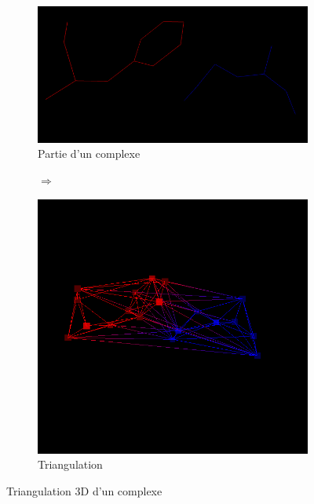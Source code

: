 \begin{figure}[ht]
\centering
\begin{subfigure}{0.45\textwidth}
  \centering
  \includegraphics[width=\textwidth]{figures/small_prot.png}
  \caption{Partie d'un complexe}
  \label{fig::small_prot}
\end{subfigure}%
\begin{subfigure}{0.1\textwidth}
  \centering
  $\Longrightarrow$
\end{subfigure}%
\begin{subfigure}{0.45\textwidth}
  \centering
  \includegraphics[width=\textwidth]{figures/3d_triangulation04.png}
  \caption{Triangulation}
  \label{fig::prot_delaunay}
\end{subfigure}
\caption{Triangulation 3D d'un complexe}
\label{fig::delaunays_3d}
\end{figure}

